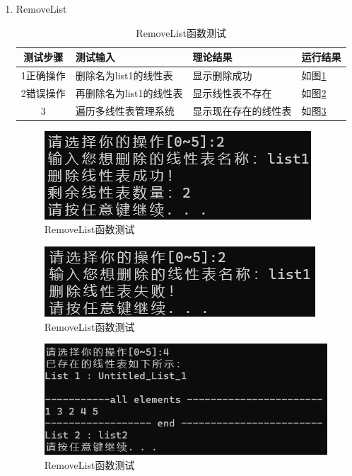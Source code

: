 \documentclass[supercite]{Experimental_Report}
\theoremstyle{definition}
\begin{document}
\begin{enumerate}
	\item RemoveList
	\begin{table}[h!]
		\begin{center}
			\caption{RemoveList函数测试}
			\begin{tabular}{|c|p{4cm}<{\centering}|p{4cm}<{\centering}|p{4cm}<{\centering}|} 
				\hline
				\textbf{测试步骤} & \textbf{测试输入} & \textbf{理论结果} & \textbf{运行结果} \\
				\hline
				1正确操作 & 删除名为list1的线性表 &显示删除成功 &如图\ref{fig1-17-1}\\
				\hline
				2错误操作 & 再删除名为list1的线性表 &显示线性表不存在 &如图\ref{fig1-17-2}\\
				\hline
				3 & 遍历多线性表管理系统 &显示现在存在的线性表 &如图\ref{fig1-17-3}\\
				\hline
			\end{tabular}
		\end{center}
	\end{table}
	\begin{figure}[H] %
		\begin{center}
			\includegraphics[width=0.5\linewidth]{images/linklist/19-2-1.png}
			\caption{ RemoveList函数测试}
			\label{fig1-17-1}
		\end{center}
	\end{figure}
	\begin{figure}[H] %
		\begin{center}
			\includegraphics[width=0.5\linewidth]{images/linklist/19-2-2.png}
			\caption{ RemoveList函数测试}
			\label{fig1-17-2}
		\end{center}
	\end{figure}
	\begin{figure}[H] %
		\begin{center}
			\includegraphics[width=0.5\linewidth]{images/linklist/19-2-4.png}
			\caption{ RemoveList函数测试}
			\label{fig1-17-3}
		\end{center}
	\end{figure}


\end{enumerate}
\end{document}
